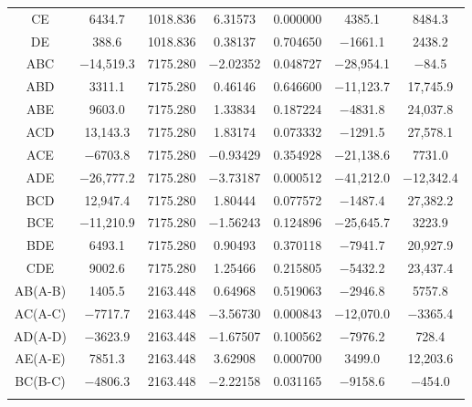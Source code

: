 \documentclass[materials,article,accept,pdftex,moreauthors]{Definitions/mdpi}
\begin{document}
\begin{table}[H]
\begin{tabularx}{\textwidth}{CCCCCCC}
         CE & 6434.7 & 1018.836 & 6.31573 & 0.000000 & 4385.1 & 8484.3 \\        
           DE & 388.6 & 1018.836 & 0.38137 & 0.704650 & $-$1661.1 & 2438.2 \\ 
         ABC & $-$14,519.3 & 7175.280 & $-$2.02352 & 0.048727 & $-$28,954.1 & $-$84.5 \\ 
        ABD & 3311.1 & 7175.280 & 0.46146 & 0.646600 & $-$11,123.7 & 17,745.9 \\ 
        ABE & 9603.0 & 7175.280 & 1.33834 & 0.187224 & $-$4831.8 & 24,037.8 \\ 
        ACD & 13,143.3 & 7175.280 & 1.83174 & 0.073332 & $-$1291.5 & 27,578.1 \\ 
        ACE & $-$6703.8 & 7175.280 & $-$0.93429 & 0.354928 & $-$21,138.6 & 7731.0 \\ 
         ADE & $-$26,777.2 & 7175.280 & $-$3.73187 & 0.000512 & $-$41,212.0 & $-$12,342.4 \\ 
        BCD & 12,947.4 & 7175.280 & 1.80444 & 0.077572 & $-$1487.4 & 27,382.2 \\ 
        BCE & $-$11,210.9 & 7175.280 & $-$1.56243 & 0.124896 & $-$25,645.7 & 3223.9 \\ 
        BDE & 6493.1 & 7175.280 & 0.90493 & 0.370118 & $-$7941.7 & 20,927.9 \\ 
        CDE & 9002.6 & 7175.280 & 1.25466 & 0.215805 & $-$5432.2 & 23,437.4 \\ 
        AB(A-B) & 1405.5 & 2163.448 & 0.64968 & 0.519063 & $-$2946.8 & 5757.8 \\ 
         AC(A-C) & $-$7717.7 & 2163.448 & $-$3.56730 & 0.000843 & $-$12,070.0 & $-$3365.4 \\ 
        AD(A-D) & $-$3623.9 & 2163.448 & $-$1.67507 & 0.100562 & $-$7976.2 & 728.4 \\ 
         AE(A-E) & 7851.3 & 2163.448 & 3.62908 & 0.000700 & 3499.0 & 12,203.6 \\ 
         BC(B-C) & $-$4806.3 & 2163.448 & $-$2.22158 & 0.031165 & $-$9158.6 & $-$454.0 \\ 

\end{tabularx}
\end{table}
\end{document}
